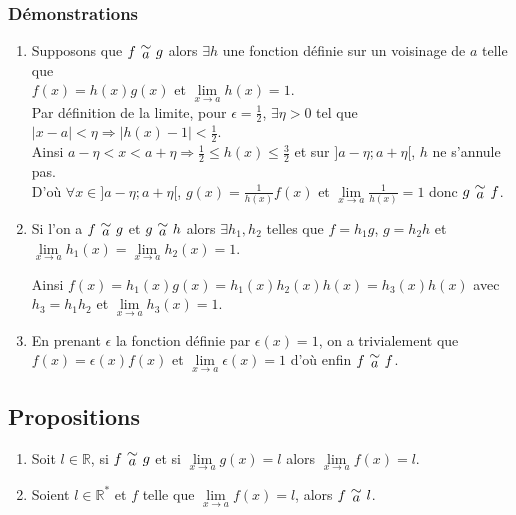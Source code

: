 \documentclass[a4paper,10pt]{book} %
\newcommand{\R}{\mathbb{R}}
\newcommand{\equi}[1]{\renewcommand{\arraystretch}{0.3}~\begin{matrix}\sim\\#1\end{matrix}~\renewcommand{\arraystretch}{1}}
\begin{document}
\subsubsection{Démonstrations}
\begin{enumerate}
\item Supposons que $f \equi{a} g$ alors $\exists h$ une fonction définie sur un voisinage de $a$ telle que\\
$f(x)=h(x)g(x)$ et $\lim\limits_{x\rightarrow a}h(x)=1$.\\

Par définition de la limite, pour $\epsilon=\frac{1}{2}$, $\exists \eta>0$ tel que $|x-a|<\eta \Rightarrow |h(x)-1|<\frac{1}{2}$.\\

Ainsi $a-\eta<x<a+\eta \Rightarrow \frac{1}{2}\leq h(x)\leq \frac{3}{2}$ et sur $]a-\eta ; a+\eta[$, $h$ ne s'annule pas.\\

D'où $\forall x\in ]a-\eta ; a+\eta[$, $g(x)=\frac{1}{h(x)}f(x)$ et $\lim\limits_{x\rightarrow a}\frac{1}{h(x)}=1$ donc $g \equi{a} f$.

\bigskip

\item Si l'on a $f \equi{a} g$ et $g \equi{a} h$ alors $\exists h_1,h_2$ telles que $f=h_1g$, $g=h_2h$ et $\lim\limits_{x\rightarrow a}h_1(x)=\lim\limits_{x\rightarrow a}h_2(x)=1$.

Ainsi $f(x)=h_1(x)g(x)=h_1(x)h_2(x)h(x)=h_3(x)h(x)$ avec $h_3=h_1h_2$ et $\lim\limits_{x\rightarrow a}h_3(x)=1$.

\bigskip

\item En prenant $\epsilon$ la fonction définie par $\epsilon(x)=1$, on a trivialement que $f(x)=\epsilon(x)f(x)$ et $\lim\limits_{x\rightarrow a}\epsilon(x)=1$ d'où enfin $f \equi{a} f$.
\end{enumerate}

\newpage

\subsection{Propositions}
\begin{enumerate}
\item Soit $l\in \R$, si $f \equi{a} g$ et si $\lim\limits_{x\rightarrow a}g(x)=l$ alors $\lim\limits_{x\rightarrow a}f(x)=l$.
\item Soient $l\in \R^*$ et $f$ telle que $\lim\limits_{x\rightarrow a}f(x)=l$, alors $f\equi{a}l$.
\end{enumerate}
\end{document}
